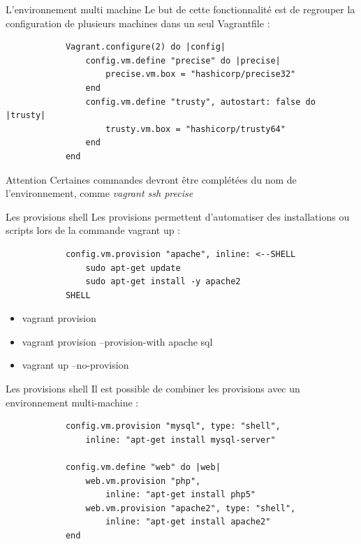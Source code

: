 \documentclass{beamer}
\begin{document}
    \begin{frame}[containsverbatim]{L'environnement multi machine}
        Le but de cette fonctionnalité est de regrouper la configuration de plusieurs machines dans un seul Vagrantfile :
        \begin{verbatim}
            Vagrant.configure(2) do |config|
                config.vm.define "precise" do |precise|
                    precise.vm.box = "hashicorp/precise32"
                end
                config.vm.define "trusty", autostart: false do |trusty|
                    trusty.vm.box = "hashicorp/trusty64"
                end
            end
        \end{verbatim}
        \begin{alertblock}{Attention}
            Certaines commandes devront être complétées du nom de l'environnement, comme \em{vagrant ssh precise}
        \end{alertblock}
    \end{frame}

    \begin{frame}[containsverbatim]{Les provisions shell}
        Les provisions permettent d'automatiser des installations ou scripts lors de la commande vagrant up :
        \begin{verbatim}
            config.vm.provision "apache", inline: <--SHELL
                sudo apt-get update
                sudo apt-get install -y apache2
            SHELL
        \end{verbatim}
        \begin{itemize}
            \item{vagrant provision}
            \item{vagrant provision --provision-with apache sql}
            \item{vagrant up --no-provision}
        \end{itemize}
    \end{frame}

    \begin{frame}[containsverbatim]{Les provisions shell}
        Il est possible de combiner les provisions avec un environnement multi-machine :
        \begin{verbatim}
            config.vm.provision "mysql", type: "shell", 
                inline: "apt-get install mysql-server"
            
            config.vm.define "web" do |web|
                web.vm.provision "php", 
                    inline: "apt-get install php5"
                web.vm.provision "apache2", type: "shell", 
                    inline: "apt-get install apache2"
            end
        \end{verbatim}
    \end{frame}
\end{document}
